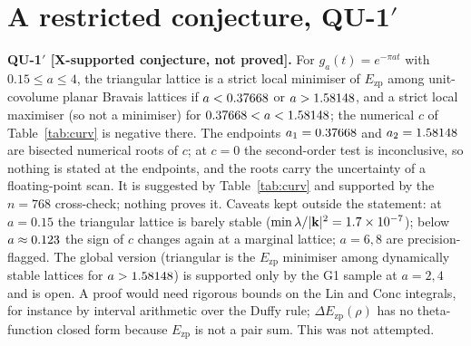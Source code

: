 \documentclass[10pt]{article}
\newcommand{\tier}[1]{\textsf{[#1]}}
\newcommand{\Ezp}{E_{\mathrm{zp}}}
\begin{document}
\section{A restricted conjecture, QU-1$'$}\label{sec:qu1p}
\textbf{QU-1$'$ \tier{X-supported conjecture, not proved}.} For $g_a(t)=e^{-\pi at}$ with $0.15\le a\le4$, the triangular lattice is a strict local minimiser of $\Ezp$ among unit-covolume planar Bravais lattices if $a<0.37668$ or $a>1.58148$, and a strict local maximiser (so not a minimiser) for $0.37668<a<1.58148$; the numerical $c$ of Table~\ref{tab:curv} is negative there.
The endpoints $a_1=0.37668$ and $a_2=1.58148$ are bisected numerical roots of $c$; at $c=0$ the second-order test is inconclusive, so nothing is stated at the endpoints, and the roots carry the uncertainty of a floating-point scan.
It is suggested by Table~\ref{tab:curv} and supported by the $n=768$ cross-check; nothing proves it. Caveats kept outside the statement: at $a=0.15$ the triangular lattice is barely stable ($\min\lambda/|\mathbf k|^2=1.7\times10^{-7}$); below $a\approx0.123$ the sign of $c$
changes again at a marginal lattice; $a=6,8$ are precision-flagged. The global version (triangular is the $\Ezp$ minimiser among dynamically stable lattices for $a>1.58148$) is supported only by the G1 sample at $a=2,4$ and is open. A proof would need rigorous bounds on the $\mathrm{Lin}$ and $\mathrm{Conc}$ integrals,
for instance by interval arithmetic over the Duffy rule; $\Delta\Ezp(\rho)$ has no theta-function closed form because $\Ezp$ is not a pair sum. This was not attempted.

\end{document}
